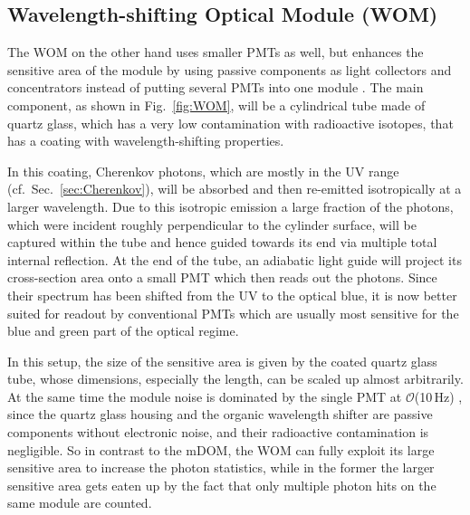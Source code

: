 \subsection{Wavelength-shifting Optical Module (WOM)}
\label{sec:WOM}

The WOM on the other hand uses smaller PMTs as well, but enhances the sensitive
area of the module by using passive components as light collectors and
concentrators instead of putting several PMTs into one module \cite{WOM_ICRC}.
The main component, as shown in Fig.~\ref{fig:WOM}, will be a cylindrical tube
made of quartz glass, which has a very low contamination with radioactive
isotopes, that has a coating with wavelength-shifting properties.

In this coating, Cherenkov photons, which are mostly in the UV range (cf.\
Sec.~\ref{sec:Cherenkov}), will be absorbed and then re-emitted isotropically
at a larger wavelength. Due to this isotropic emission a large fraction of the
photons, which were incident roughly perpendicular to the cylinder surface,
will be captured within the tube and hence guided towards its end via multiple
total internal reflection. At the end of the tube, an adiabatic light guide
will project its cross-section area onto a small PMT which then reads out the
photons. Since their spectrum has been shifted from the UV to the optical blue,
it is now better suited for readout by conventional PMTs which are usually most
sensitive for the blue and green part of the optical regime.

In this setup, the size of the sensitive area is given by the coated quartz
glass tube, whose dimensions, especially the length, can be scaled up almost
arbitrarily. At the same time the module noise is dominated by the single PMT
at $\mathcal{O}$(10\,Hz) \cite{WOM_ICRC}, since the quartz glass housing and the
organic wavelength shifter are passive components without electronic noise, and
their radioactive contamination is negligible. So in contrast to the mDOM, the
WOM can fully exploit its large sensitive area to increase the photon
statistics, while in the former the larger sensitive area gets eaten up by the
fact that only multiple photon hits on the same module are counted.
